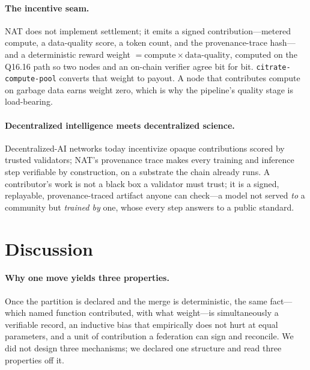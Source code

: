 \documentclass[11pt]{article}
\newcommand{\Qff}{Q16.16}
\begin{document}
\paragraph{The incentive seam.}
NAT does not implement settlement; it emits a signed contribution---metered compute, a data-quality
score, a token count, and the provenance-trace hash---and a deterministic reward weight $=
\mathrm{compute}\times\mathrm{data\text{-}quality}$, computed on the \Qff{} path so two nodes and an
on-chain verifier agree bit for bit. \texttt{citrate-compute-pool} converts that weight to payout. A
node that contributes compute on garbage data earns weight zero, which is why the pipeline's quality
stage is load-bearing.

\paragraph{Decentralized intelligence meets decentralized science.}
Decentralized-AI networks today incentivize opaque contributions scored by trusted validators; NAT's
provenance trace makes every training and inference step verifiable by construction, on a substrate
the chain already runs. A contributor's work is not a black box a validator must trust; it is a
signed, replayable, provenance-traced artifact anyone can check---a model not served \emph{to} a
community but \emph{trained by} one, whose every step answers to a public standard.

\section{Discussion}\label{sec:disc}

\paragraph{Why one move yields three properties.}
Once the partition is declared and the merge is deterministic, the same fact---which named function
contributed, with what weight---is simultaneously a verifiable record, an inductive bias that
empirically does not hurt at equal parameters, and a unit of contribution a federation can sign and
reconcile. We did not design three mechanisms; we declared one structure and read three properties
off it.
\end{document}
